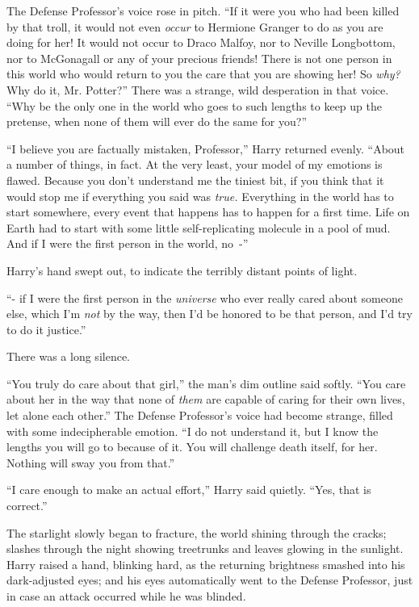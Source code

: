 The Defense Professor's voice rose in pitch. ``If it were you who had been killed by that troll, it would not even \emph{occur} to Hermione Granger to do as you are doing for her! It would not occur to Draco Malfoy, nor to Neville Longbottom, nor to McGonagall or any of your precious friends! There is not one person in this world who would return to you the care that you are showing her! So \emph{why?} Why do it, Mr. Potter?'' There was a strange, wild desperation in that voice. ``Why be the only one in the world who goes to such lengths to keep up the pretense, when none of them will ever do the same for you?''

``I believe you are factually mistaken, Professor,'' Harry returned evenly. ``About a number of things, in fact. At the very least, your model of my emotions is flawed. Because you don't understand me the tiniest bit, if you think that it would stop me if everything you said was \emph{true.} Everything in the world has to start somewhere, every event that happens has to happen for a first time. Life on Earth had to start with some little self-replicating molecule in a pool of mud. And if I were the first person in the world, no~-''

Harry's hand swept out, to indicate the terribly distant points of light.

``- if I were the first person in the \emph{universe} who ever really cared about someone else, which I'm \emph{not} by the way, then I'd be honored to be that person, and I'd try to do it justice.''

There was a long silence.

``You truly do care about that girl,'' the man's dim outline said softly. ``You care about her in the way that none of \emph{them} are capable of caring for their own lives, let alone each other.'' The Defense Professor's voice had become strange, filled with some indecipherable emotion. ``I do not understand it, but I know the lengths you will go to because of it. You will challenge death itself, for her. Nothing will sway you from that.''

``I care enough to make an actual effort,'' Harry said quietly. ``Yes, that is correct.''

The starlight slowly began to fracture, the world shining through the cracks; slashes through the night showing treetrunks and leaves glowing in the sunlight. Harry raised a hand, blinking hard, as the returning brightness smashed into his dark-adjusted eyes; and his eyes automatically went to the Defense Professor, just in case an attack occurred while he was blinded.

